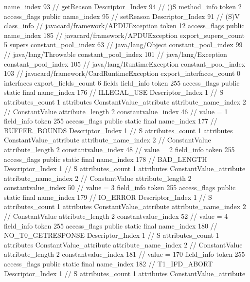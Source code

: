 {{{{{					name_index	93		// getReason
					Descriptor_Index	94		// ()S
				}
				method_info {
					token	2
					access_flags	public
					name_index	95		// setReason
					Descriptor_Index	91		// (S)V
				}
			}
		}
		class_info {		// javacard/framework/APDUException
			token	12
			access_flags	public
			name_index	185		// javacard/framework/APDUException
			export_supers_count	5
			supers {
				constant_pool_index	63		// java/lang/Object
				constant_pool_index	99		// java/lang/Throwable
				constant_pool_index	101		// java/lang/Exception
				constant_pool_index	105		// java/lang/RuntimeException
				constant_pool_index	103		// javacard/framework/CardRuntimeException
			}
			export_interfaces_count	0
			interfaces {
			}
			export_fields_count	6
			fields {
			field_info {
				token	255
				access_flags	public static final
				name_index	176		// ILLEGAL_USE
				Descriptor_Index	1		// S
				attributes_count	1
				attributes {
				ConstantValue_attribute {
					attribute_name_index	2		// ConstantValue
					attribute_length	2
					constantvalue_index	46		// value = 1
				}
				}
			}
			field_info {
				token	255
				access_flags	public static final
				name_index	177		// BUFFER_BOUNDS
				Descriptor_Index	1		// S
				attributes_count	1
				attributes {
				ConstantValue_attribute {
					attribute_name_index	2		// ConstantValue
					attribute_length	2
					constantvalue_index	48		// value = 2
				}
				}
			}
			field_info {
				token	255
				access_flags	public static final
				name_index	178		// BAD_LENGTH
				Descriptor_Index	1		// S
				attributes_count	1
				attributes {
				ConstantValue_attribute {
					attribute_name_index	2		// ConstantValue
					attribute_length	2
					constantvalue_index	50		// value = 3
				}
				}
			}
			field_info {
				token	255
				access_flags	public static final
				name_index	179		// IO_ERROR
				Descriptor_Index	1		// S
				attributes_count	1
				attributes {
				ConstantValue_attribute {
					attribute_name_index	2		// ConstantValue
					attribute_length	2
					constantvalue_index	52		// value = 4
				}
				}
			}
			field_info {
				token	255
				access_flags	public static final
				name_index	180		// NO_T0_GETRESPONSE
				Descriptor_Index	1		// S
				attributes_count	1
				attributes {
				ConstantValue_attribute {
					attribute_name_index	2		// ConstantValue
					attribute_length	2
					constantvalue_index	181		// value = 170
				}
				}
			}
			field_info {
				token	255
				access_flags	public static final
				name_index	182		// T1_IFD_ABORT
				Descriptor_Index	1		// S
				attributes_count	1
				attributes {
				ConstantValue_attribute {
}}}}}}}
